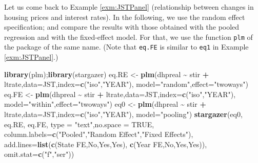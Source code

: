 \documentclass[
  12pt,
]{book}
\newenvironment{Shaded}{\begin{snugshade}}{\end{snugshade}}
\newcommand{\AttributeTok}[1]{\textcolor[rgb]{0.13,0.29,0.53}{#1}}
\newcommand{\ConstantTok}[1]{\textcolor[rgb]{0.56,0.35,0.01}{#1}}
\newcommand{\FunctionTok}[1]{\textcolor[rgb]{0.13,0.29,0.53}{\textbf{#1}}}
\newcommand{\NormalTok}[1]{#1}
\newcommand{\OtherTok}[1]{\textcolor[rgb]{0.56,0.35,0.01}{#1}}
\newcommand{\SpecialCharTok}[1]{\textcolor[rgb]{0.81,0.36,0.00}{\textbf{#1}}}
\newcommand{\StringTok}[1]{\textcolor[rgb]{0.31,0.60,0.02}{#1}}
\theoremstyle{definition}
\theoremstyle{definition}
\theoremstyle{definition}
\theoremstyle{definition}
\theoremstyle{remark}
\begin{document}
Let us come back to Example \ref{exm:JSTPanel} (relationship between changes in housing prices and interest rates). In the following, we use the random effect specification; and compare the results with those obtained with the pooled regression and with the fixed-effect model. For that, we use the function \texttt{plm} of the package of the same name. (Note that \texttt{eq.FE} is similar to \texttt{eq1} in Example \ref{exm:JSTPanel}.)

\begin{Shaded}
\begin{Highlighting}[]
\FunctionTok{library}\NormalTok{(plm);}\FunctionTok{library}\NormalTok{(stargazer)}
\NormalTok{eq.RE }\OtherTok{\textless{}{-}} \FunctionTok{plm}\NormalTok{(dhpreal }\SpecialCharTok{\textasciitilde{}}\NormalTok{ stir }\SpecialCharTok{+}\NormalTok{ ltrate,}\AttributeTok{data=}\NormalTok{JST,}\AttributeTok{index=}\FunctionTok{c}\NormalTok{(}\StringTok{"iso"}\NormalTok{,}\StringTok{"YEAR"}\NormalTok{),}
             \AttributeTok{model=}\StringTok{"random"}\NormalTok{,}\AttributeTok{effect=}\StringTok{"twoways"}\NormalTok{)}
\NormalTok{eq.FE }\OtherTok{\textless{}{-}} \FunctionTok{plm}\NormalTok{(dhpreal }\SpecialCharTok{\textasciitilde{}}\NormalTok{ stir }\SpecialCharTok{+}\NormalTok{ ltrate,}\AttributeTok{data=}\NormalTok{JST,}\AttributeTok{index=}\FunctionTok{c}\NormalTok{(}\StringTok{"iso"}\NormalTok{,}\StringTok{"YEAR"}\NormalTok{),}
             \AttributeTok{model=}\StringTok{"within"}\NormalTok{,}\AttributeTok{effect=}\StringTok{"twoways"}\NormalTok{)}
\NormalTok{eq0   }\OtherTok{\textless{}{-}} \FunctionTok{plm}\NormalTok{(dhpreal }\SpecialCharTok{\textasciitilde{}}\NormalTok{ stir }\SpecialCharTok{+}\NormalTok{ ltrate,}\AttributeTok{data=}\NormalTok{JST,}\AttributeTok{index=}\FunctionTok{c}\NormalTok{(}\StringTok{"iso"}\NormalTok{,}\StringTok{"YEAR"}\NormalTok{),}
             \AttributeTok{model=}\StringTok{"pooling"}\NormalTok{) }
\FunctionTok{stargazer}\NormalTok{(eq0, eq.RE, eq.FE, }\AttributeTok{type =} \StringTok{"text"}\NormalTok{,}\AttributeTok{no.space =} \ConstantTok{TRUE}\NormalTok{,}
                     \AttributeTok{column.labels=}\FunctionTok{c}\NormalTok{(}\StringTok{"Pooled"}\NormalTok{,}\StringTok{"Random Effect"}\NormalTok{,}\StringTok{"Fixed Effects"}\NormalTok{),}
                     \AttributeTok{add.lines=}\FunctionTok{list}\NormalTok{(}\FunctionTok{c}\NormalTok{(}\StringTok{\textquotesingle{}State FE\textquotesingle{}}\NormalTok{,}\StringTok{\textquotesingle{}No\textquotesingle{}}\NormalTok{,}\StringTok{\textquotesingle{}Yes\textquotesingle{}}\NormalTok{,}\StringTok{\textquotesingle{}Yes\textquotesingle{}}\NormalTok{),}
                                    \FunctionTok{c}\NormalTok{(}\StringTok{\textquotesingle{}Year FE\textquotesingle{}}\NormalTok{,}\StringTok{\textquotesingle{}No\textquotesingle{}}\NormalTok{,}\StringTok{\textquotesingle{}Yes\textquotesingle{}}\NormalTok{,}\StringTok{\textquotesingle{}Yes\textquotesingle{}}\NormalTok{)),}
                     \AttributeTok{omit.stat=}\FunctionTok{c}\NormalTok{(}\StringTok{"f"}\NormalTok{,}\StringTok{"ser"}\NormalTok{))}
\end{Highlighting}
\end{Shaded}
\end{document}
